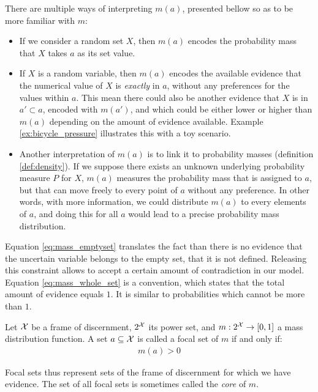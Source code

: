 There are multiple ways of interpreting $m(a)$, presented bellow so as to be more familiar with $m$:
\begin{itemize}
    \item If we consider a random set $X$, then $m(a)$ encodes the probability mass that $X$ takes $a$ as its set value.
    \item If $X$ is a random variable, then $m(a)$ encodes the available evidence that the numerical value of $X$ is \textit{exactly} in $a$, without any preferences for the values within $a$. This mean there could also be another evidence that $X$ is in $a'\subset a$, encoded with $m(a')$, and which could be either lower or higher than $m(a)$ depending on the amount of evidence available. Example \ref{ex:bicycle_pressure} illustrates this with a toy scenario. 
    \item Another interpretation of $m(a)$ is to link it to probability masses (definition \ref{def:density}). If we suppose there exists an unknown underlying probability measure $P$ for $X$, $m(a)$ measures the probability mass that is assigned to $a$, but that can move freely to every point of $a$ without any preference. In other words, with more information, we could distribute $m(a)$ to every elements of $a$, and doing this for all $a$ would lead to a precise probability mass distribution.
\end{itemize}

\begin{remark}
    Equation \eqref{eq:mass_emptyset} translates the fact than there is no evidence that the uncertain variable belongs to the empty set, \ie that it is not defined. Releasing this constraint allows to accept a certain amount of contradiction in our model.
    Equation \eqref{eq:mass_whole_set} is a convention, which states that the total amount of evidence equals $1$. It is similar to probabilities which cannot be more than $1$. 
\end{remark}

\begin{definition}\label{def:focal_set}
    Let ${\mathcal{X}}$ be a frame of discernment, $2^{\mathcal{X}}$ its power set, and $m:2^{\mathcal{X}}\rightarrow[0,1]$ a mass distribution function. A set $a\subseteq{\mathcal{X}}$ is called a focal set of $m$ if and only if:
    \begin{align}
        m(a)>0\label{eq:focal_set}
    \end{align}
\end{definition}
Focal sets thus represent sets of the frame of discernment for which we have evidence. The set of all focal sets is sometimes called the \textit{core} of $m$.

